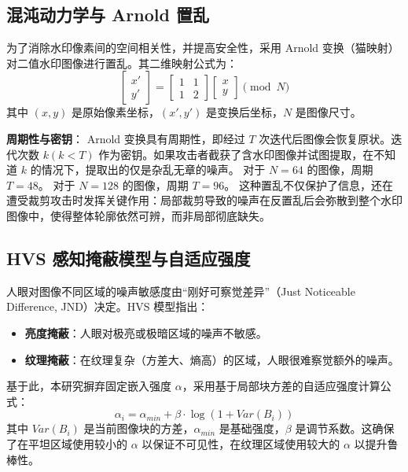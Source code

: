 \documentclass[zihao=-4, a4paper]{ctexart} %
\begin{document}
	\subsection{混沌动力学与 Arnold 置乱}
	为了消除水印像素间的空间相关性，并提高安全性，采用 Arnold 变换（猫映射）对二值水印图像进行置乱。其二维映射公式为：
	\begin{equation}
		\begin{bmatrix} x' \\ y' \end{bmatrix} = \begin{bmatrix} 1 & 1 \\ 1 & 2 \end{bmatrix} \begin{bmatrix} x \\ y \end{bmatrix} \pmod N
	\end{equation}
	其中 $(x,y)$ 是原始像素坐标，$(x',y')$ 是变换后坐标，$N$ 是图像尺寸。
	
	\textbf{周期性与密钥}：
	Arnold 变换具有周期性，即经过 $T$ 次迭代后图像会恢复原状。迭代次数 $k (k < T)$ 作为密钥。如果攻击者截获了含水印图像并试图提取，在不知道 $k$ 的情况下，提取出的仅是杂乱无章的噪声。
	对于 $N=64$ 的图像，周期 $T=48$。
	对于 $N=128$ 的图像，周期 $T=96$。
	这种置乱不仅保护了信息，还在遭受裁剪攻击时发挥关键作用：局部裁剪导致的噪声在反置乱后会弥散到整个水印图像中，使得整体轮廓依然可辨，而非局部彻底缺失。
	
	\subsection{HVS 感知掩蔽模型与自适应强度}
	人眼对图像不同区域的噪声敏感度由“刚好可察觉差异”（Just Noticeable Difference, JND）决定。HVS 模型指出：
	\begin{itemize}
		\item \textbf{亮度掩蔽}：人眼对极亮或极暗区域的噪声不敏感。
		\item \textbf{纹理掩蔽}：在纹理复杂（方差大、熵高）的区域，人眼很难察觉额外的噪声。
	\end{itemize}
	基于此，本研究摒弃固定嵌入强度 $\alpha$，采用基于局部块方差的自适应强度计算公式：
	\begin{equation}
		\alpha_i = \alpha_{min} + \beta \cdot \log(1 + Var(B_i))
	\end{equation}
	其中 $Var(B_i)$ 是当前图像块的方差，$\alpha_{min}$ 是基础强度，$\beta$ 是调节系数。这确保了在平坦区域使用较小的 $\alpha$ 以保证不可见性，在纹理区域使用较大的 $\alpha$ 以提升鲁棒性。
	
\end{document}
